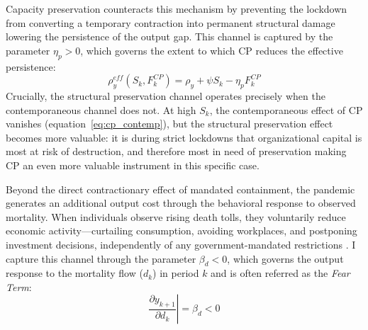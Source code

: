 Capacity preservation counteracts this mechanism by preventing the lockdown from converting a temporary contraction into permanent structural damage lowering the persistence of the output gap. This channel is captured by the parameter $\eta_p > 0$, which governs the extent to which CP reduces the effective persistence:
%
\begin{equation}
    \rho^{eff}_y(S_k, F^{CP}_k) = \rho_y + \psi S_k - \eta_p F^{CP}_k
    \label{eq:rho_eff}
\end{equation}
%
Crucially, the structural preservation channel operates precisely when the contemporaneous channel does not. At high $S_k$, the contemporaneous effect of CP vanishes (equation~\ref{eq:cp_contemp}), but the structural preservation effect becomes more valuable: it is during strict lockdowns that organizational capital is most at risk of destruction, and therefore most in need of preservation making CP an even more valuable instrument in this specific case.


Beyond the direct contractionary effect of mandated containment, the pandemic generates an additional output cost through the behavioral response to observed mortality. When individuals observe rising death tolls, they voluntarily reduce economic activity---curtailing consumption, avoiding workplaces, and postponing investment decisions, independently of any government-mandated restrictions \citep{GOOLSBEE2021}. I capture this channel through the parameter $\beta_d < 0$, which governs the output response to the mortality flow ($d_k$) in period $k$ and is often referred as the \textit{Fear Term}:
%
\begin{equation}
    \left.\frac{\partial y_{k+1}}{\partial d_k}\right| = \beta_d < 0
    \label{eq:fear}
\end{equation}
%

